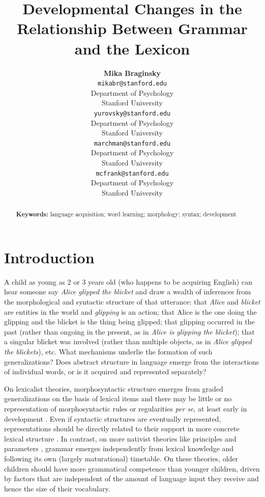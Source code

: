 \documentclass[10pt,letterpaper]{article}
\title{Developmental Changes in the Relationship Between Grammar and the Lexicon}
\author{{\large \bf Mika Braginsky} \\
  \texttt{mikabr@stanford.edu} \\
  Department of Psychology \\
  Stanford University
  \And {\large \bf Daniel Yurovsky} \\
  \texttt{yurovsky@stanford.edu} \\
  Department of Psychology \\
  Stanford University
    \And {\large \bf Virginia A. Marchman} \\
    \texttt{marchman@stanford.edu} \\
  Department of Psychology \\
  Stanford University
    \And {\large \bf Michael C. Frank}\\
    \texttt{mcfrank@stanford.edu} \\
  Department of Psychology \\
  Stanford University}
\begin{document}
\maketitle

\begin{abstract}



\textbf{Keywords:} 
language acquisition; word learning; morphology; syntax; development
\end{abstract}

\section{Introduction}

A child as young as 2 or 3 years old (who happens to be acquiring English) can hear someone say \emph{Alice glipped the blicket} and draw a wealth of inferences from the morphological and syntactic structure of that utterance: that \emph{Alice} and \emph{blicket} are entities in the world and \emph{glipping} is an action; that Alice is the one doing the glipping and the blicket is the thing being glipped; that glipping occurred in the past (rather than ongoing in the present, as in \emph{Alice is glipping the blicket}); that a singular blicket was involved (rather than multiple objects, as in \emph{Alice glipped the blickets}), etc. What mechanisms underlie the formation of such generalizations? Does abstract structure in language emerge from the interactions of individual words, or is it acquired and represented separately?

On lexicalist theories, morphosyntactic structure emerges from graded generalizations on the basis of lexical items and there may be little or no representation of morphosyntactic rules or regularities \emph{per se}, at least early in development \cite{tomasello2001,tomasello2003}. Even if syntactic structures are eventually represented, representations should be directly related to their support in more concrete lexical structure \cite{bannard2009,borensztajn2008}. In contrast, on more nativist theories like principles and parameters \cite{chomsky1981, baker2005}, grammar emerges independently from lexical knowledge and following its own (largely maturational) timetable. On these theories, older children should have more grammatical competence than younger children, driven by factors that are independent of the amount of language input they receive and hence the size of their vocabulary.
\end{document}
